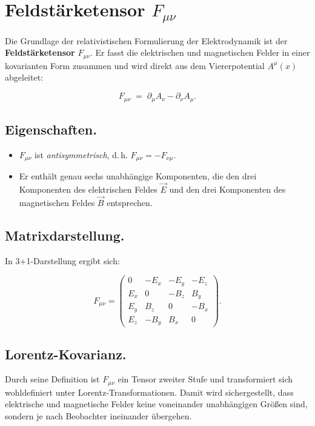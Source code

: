 \section{Feldstärketensor \(F_{\mu\nu}\)}

\label{anhangA:feldstaerketensor}

Die Grundlage der relativistischen Formulierung der Elektrodynamik
ist der \textbf{Feldstärketensor} \( F_{\mu\nu} \).
Er fasst die elektrischen und magnetischen Felder in einer 
kovarianten Form zusammen und wird direkt aus dem Viererpotential 
\( A^\mu(x) \) abgeleitet:

\[
F_{\mu\nu} \;=\; \partial_\mu A_\nu - \partial_\nu A_\mu .
\]

\subsection*{Eigenschaften.}
\begin{itemize}
	\item \( F_{\mu\nu} \) ist \emph{antisymmetrisch}, d.\,h. 
	\( F_{\mu\nu} = - F_{\nu\mu} \).  
	\item Er enthält genau sechs unabhängige Komponenten, 
	die den drei Komponenten des elektrischen Feldes \( \vec{E} \) 
	und den drei Komponenten des magnetischen Feldes \( \vec{B} \) entsprechen.
\end{itemize}

\subsection*{Matrixdarstellung.}
In 3+1-Darstellung ergibt sich:

\[
F_{\mu\nu} = 
\begin{pmatrix}
	0      & -E_x & -E_y & -E_z \\
	E_x    & 0    & -B_z & B_y \\
	E_y    & B_z  & 0    & -B_x \\
	E_z    & -B_y & B_x  & 0
\end{pmatrix}.
\]

\subsection*{Lorentz-Kovarianz.}
Durch seine Definition ist \( F_{\mu\nu} \) ein Tensor zweiter Stufe
und transformiert sich wohldefiniert unter Lorentz-Transformationen.
Damit wird sichergestellt, dass elektrische und magnetische Felder
keine voneinander unabhängigen Größen sind, sondern je nach 
Beobachter ineinander übergehen.

